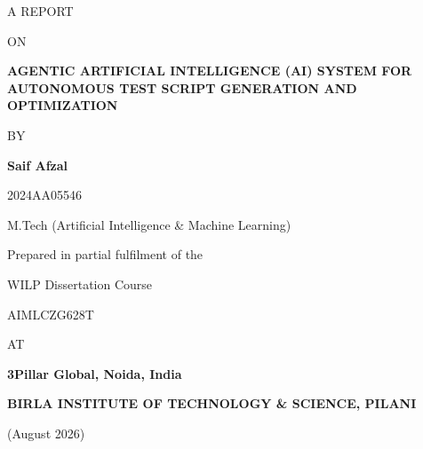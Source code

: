 \begin{titlepage}
\centering

{\large A REPORT}

\vspace{1em}
{\large ON}

\vspace{2em}
{\Large \textbf{AGENTIC ARTIFICIAL INTELLIGENCE (AI) SYSTEM FOR
AUTONOMOUS TEST SCRIPT GENERATION AND OPTIMIZATION}}

\vspace{2em}
{\large BY}

\vspace{1em}
{\large \textbf{Saif Afzal}}

{\large 2024AA05546}

{\large M.Tech (Artificial Intelligence \& Machine Learning)}

\vspace{2em}
Prepared in partial fulfilment of the

WILP Dissertation Course

AIMLCZG628T

\vspace{2em}
{\large AT}

\vspace{1em}
{\large \textbf{3Pillar Global, Noida, India}}

\vspace{2em}
{\large \textbf{BIRLA INSTITUTE OF TECHNOLOGY \& SCIENCE, PILANI}}

\vspace{1em}
{\large (August 2026)}

\end{titlepage}
